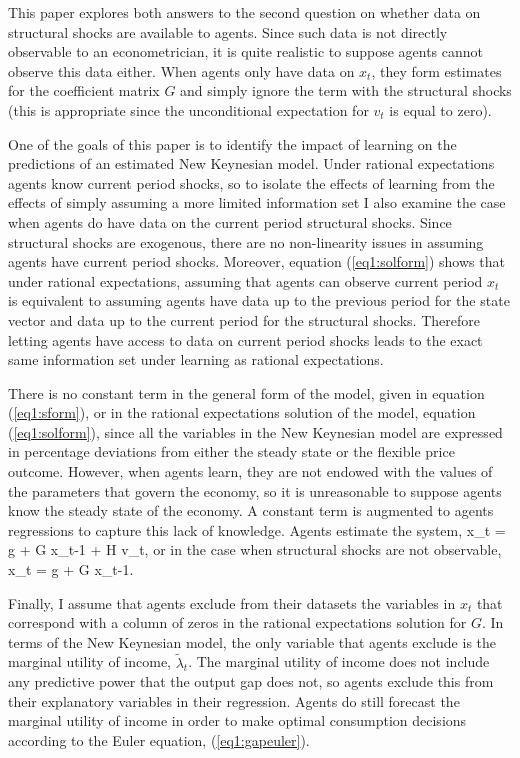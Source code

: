 This paper explores both answers to the second question on whether data on structural shocks are available to agents.  Since such data is not directly observable to an econometrician, it is quite realistic to suppose agents cannot observe this data either.  When agents only have data on $x_t$, they form estimates for the coefficient matrix $G$ and simply ignore the term with the structural shocks (this is appropriate since the unconditional expectation for $v_t$ is equal to zero).   

One of the goals of this paper is to identify the impact of learning on the predictions of an estimated New Keynesian model.  Under rational expectations agents know current period shocks, so to isolate the effects of learning from the effects of simply assuming a more limited information set I also examine the case when agents do have data on the current period structural shocks.  Since structural shocks are exogenous, there are no non-linearity issues in assuming agents have current period shocks.  Moreover, equation (\ref{eq1:solform}) shows that under rational expectations, assuming that agents can observe current period $x_t$ is equivalent to assuming agents have data up to the previous period for the state vector and data up to the current period for the structural shocks.  Therefore letting agents have access to data on current period shocks leads to the exact same information set under learning as rational expectations.

There is no constant term in the general form of the model, given in equation (\ref{eq1:sform}), or in the rational expectations solution of the model, equation (\ref{eq1:solform}), since all the variables in the New Keynesian model are expressed in percentage deviations from either the steady state or the flexible price outcome.  However, when agents learn, they are not endowed with the values of the parameters that govern the economy, so it is unreasonable to suppose agents know the steady state of the economy.  A constant term is augmented to agents regressions to capture this lack of knowledge.  Agents estimate the system,
\bdm x_t = g + G x_{t-1} + H v_t, \edm
or in the case when structural shocks are not observable,
\bdm x_t = g + G x_{t-1}. \edm

Finally, I assume that agents exclude from their datasets the variables in $x_t$ that correspond with a column of zeros in the rational expectations solution for $G$.  In terms of the New Keynesian model, the only variable that agents exclude is the marginal utility of income, $\tilde{\lambda}_t$.  The marginal utility of income does not include any predictive power that the output gap does not, so agents exclude this from their explanatory variables in their regression.  Agents do still forecast the marginal utility of income in order to make optimal consumption decisions according to the Euler equation, (\ref{eq1:gapeuler}).

